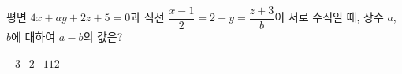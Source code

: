 평면 $4x+ay+2z+5=0$과 직선 $\dfrac{x-1}{2}=2-y=\dfrac{z+3}{b}$이 서로 수직일 때, 상수 $a$, $b$에 대하여 $a-b$의 값은?
\begin{choices32}{$-3$}{$-2$}{$-1$}{$1$}{$2$}\end{choices32}
